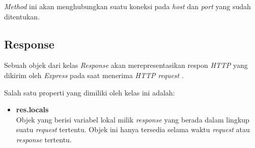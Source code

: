 \begin{itemize}
	\textit{Method} ini akan menghubungkan suatu koneksi pada \textit{host} dan \textit{port} yang sudah ditentukan. 
	
	
\end{itemize}

%
%	
%	

\subsection{Response}
Sebuah objek dari kelas \textit{Response} akan merepresentasikan respon \textit{HTTP} yang dikirim oleh \textit{Express} pada saat menerima \textit{HTTP request} \cite{tj:10:expressjsdocs}.

Salah satu properti yang dimiliki oleh kelas ini adalah:

\begin{itemize}
	\item \textbf{res.locals} \\
	Objek yang berisi variabel lokal milik \textit{response} yang berada dalam lingkup suatu \textit{request} tertentu. Objek ini hanya tersedia selama waktu \textit{request} atau \textit{response} tertentu.
\end{itemize}

